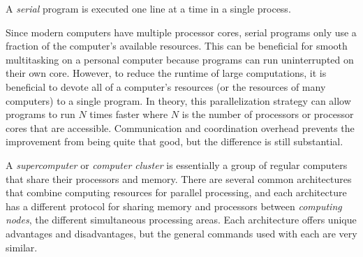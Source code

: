 A \emph{serial} program is executed one line at a time in a single process.
\begin{comment} %
This can be visualized as a program that runs all of its computations on a single processor or core.
Figure \ref{fig:htop} visualizes what this would look like by using the Linux command \li{htop}.
This command shows which programs are running, how many resources they are using up, and how much each processor core is running.

\begin{figure}[!tbp]
  \begin{subfigure}[b]{0.49\textwidth}
    \texttt{[image: figures/activenew.jpg]}
    \caption{Serial}
  \end{subfigure}
  \hfill
  \begin{subfigure}[b]{0.49\textwidth}
    \texttt{[image: figures/cluster\_activenew.jpg]}
    \caption{Parallel}
  \end{subfigure}
  \caption{In the serial implementation, one core is running the program. In the parallel, it is split across all cores.}
  \label{fig:htop}
\end{figure}
\end{comment}
Since modern computers have multiple processor cores, serial programs only use a fraction of the computer's available resources.
This can be beneficial for smooth multitasking on a personal computer because programs can run uninterrupted on their own core.
However, to reduce the runtime of large computations, it is beneficial to devote all of a computer's resources (or the resources of many computers) to a single program.
In theory, this parallelization strategy can allow programs to run $N$ times faster where $N$ is the number of processors or processor cores that are accessible.
Communication and coordination overhead prevents the improvement from being quite that good, but the difference is still substantial.

A \emph{supercomputer} or \emph{computer cluster} is essentially a group of regular computers that share their processors and memory.
There are several common architectures that combine computing resources for parallel processing, and each architecture has a different protocol for sharing memory and processors between \emph{computing nodes}, the different simultaneous processing areas.
Each architecture offers unique advantages and disadvantages, but the general commands used with each are very similar.

